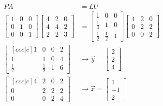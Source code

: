 \documentclass{article}
\begin{document}
\begin{align}
    PA &= LU  \nonumber \\
    \begin{bmatrix}
        1 & 0 & 0 \\
        0 & 1 & 0 \\
        0 & 0 & 1
    \end{bmatrix}
    \begin{bmatrix}
        4 & 2 & 0 \\
        4 & 4 & 2 \\
        2 & 2 & 3
    \end{bmatrix}
    & = 
    \begin{bmatrix}
        1 & 0 & 0 \\
        \frac{1}{4} & 1 & 0 \\
        \frac{1}{2} & \frac{1}{2} & 1
    \end{bmatrix}
    \begin{bmatrix}
        4 & 2 & 0 \\
        0 & 2 & 2 \\
        0 & 0 & 2
    \end{bmatrix}\\
    \begin{bmatrix}[ccc|c]
        1 & 0 & 0 & 2 \\
        1 & 1 & 0 & 4 \\
        \frac{1}{2} & \frac{1}{2} & 1 & 6
    \end{bmatrix}
    & \rightarrow 
    \overrightarrow{y} = \begin{bmatrix}
        2 \\
        2 \\
        4
    \end{bmatrix} \\
    \begin{bmatrix}[ccc|c]
        4 & 2 & 0 & 2\\
        0 & 2 & 2 & 2\\
        0 & 0 & 2 & 4
    \end{bmatrix}
    & \rightarrow
    \overrightarrow{x} = \begin{bmatrix}
        1 \\
        -1 \\
        2
    \end{bmatrix}
\end{align}
\end{document}
